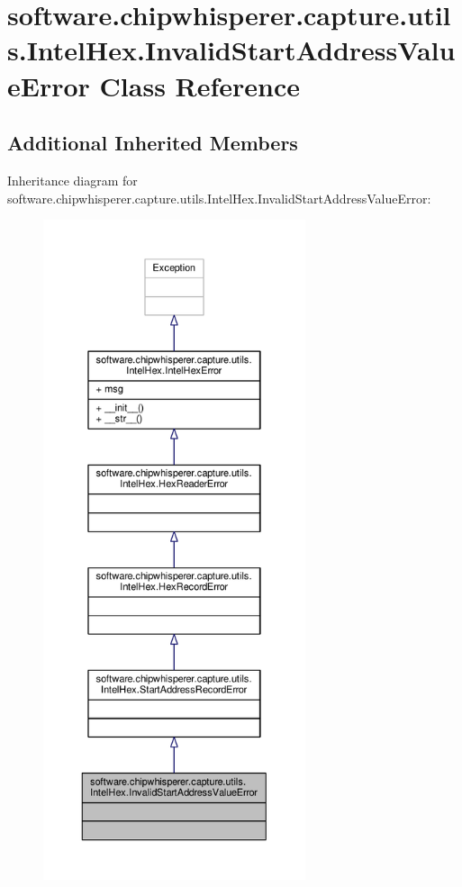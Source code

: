 \hypertarget{classsoftware_1_1chipwhisperer_1_1capture_1_1utils_1_1IntelHex_1_1InvalidStartAddressValueError}{}\section{software.\+chipwhisperer.\+capture.\+utils.\+Intel\+Hex.\+Invalid\+Start\+Address\+Value\+Error Class Reference}
\label{classsoftware_1_1chipwhisperer_1_1capture_1_1utils_1_1IntelHex_1_1InvalidStartAddressValueError}
\subsection*{Additional Inherited Members}


Inheritance diagram for software.\+chipwhisperer.\+capture.\+utils.\+Intel\+Hex.\+Invalid\+Start\+Address\+Value\+Error\+:\nopagebreak
\begin{figure}[H]
\begin{center}
\leavevmode
\includegraphics[height=550pt]{df/d7a/classsoftware_1_1chipwhisperer_1_1capture_1_1utils_1_1IntelHex_1_1InvalidStartAddressValueError__inherit__graph}
\end{center}
\end{figure}


